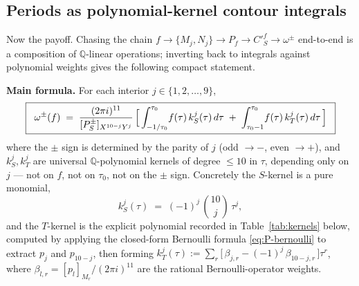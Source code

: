 \documentclass[11pt,letterpaper]{article}
\newcommand{\QQ}{\mathbb{Q}}
\begin{document}
\subsection{Periods as polynomial-kernel contour integrals}\label{app:kernel-integrals}

Now the payoff.  Chasing the chain
\(f \to \{M_j, N_j\} \to P_f \to C'^f_S \to \omega^\pm\)
end-to-end is a composition of $\QQ$-linear operations; inverting back to
integrals against polynomial weights gives the following compact statement.

\medskip\noindent\textbf{Main formula.}
For each interior $j \in \{1, 2, \ldots, 9\}$,
\begin{equation}\label{eq:app-kernel-master}
  \boxed{\;\;
  \omega^\pm(f) \;=\; \frac{(2\pi i)^{11}}{[P^\pm_S]_{X^{10-j}Y^j}}
   \,\Bigl[\,\int_{-1/\tau_0}^{\tau_0}\! f(\tau)\,k_S^{j}(\tau)\,d\tau
        \;+\; \int_{\tau_0-1}^{\tau_0}\! f(\tau)\,k_T^{j}(\tau)\,d\tau\,\Bigr]
  \;\;}
\end{equation}
where the $\pm$ sign is determined by the parity of $j$ (odd $\to -$, even $\to +$),
and $k_S^j, k_T^j$ are universal $\QQ$-polynomial kernels of degree $\le 10$
in $\tau$, depending only on $j$ --- not on $f$, not on $\tau_0$, not on
the $\pm$ sign.  Concretely the $S$-kernel is a pure monomial,
\begin{equation}\label{eq:app-kS}
  k_S^{j}(\tau) \;=\; (-1)^j\,\binom{10}{j}\,\tau^j,
\end{equation}
and the $T$-kernel is the explicit polynomial recorded in Table~\ref{tab:kernels}
below, computed by applying the closed-form Bernoulli formula
\eqref{eq:P-bernoulli} to extract $p_j$ and $p_{10-j}$, then forming
$k_T^j(\tau) := \sum_r\bigl[\,\beta_{j,r} - (-1)^j\,\beta_{10-j,r}\,\bigr]\tau^r$,
where $\beta_{l,r} = [p_l]_{M_r}/(2\pi i)^{11}$ are the rational
Bernoulli-operator weights.
\end{document}

